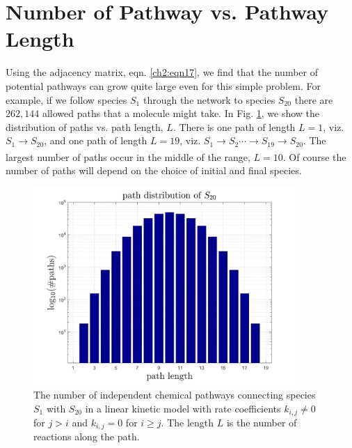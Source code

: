 \section{Number of Pathway vs. Pathway Length}
\label{ch2dot5:sec:path_len}
Using the adjacency matrix, eqn. \ref{ch2:eqn17}, we find that the number of potential
pathways can grow quite large even for this simple problem. For example, if we follow
species $S_1$ through the network to species $S_{20}$ there are $262,144$ allowed paths that a
molecule might take. In Fig. \ref{ch2dot5:fig3}, we show the distribution of paths vs. path length, $L$.
There is one path of length $L = 1$, viz. $S_1 \xrightarrow[]{} S_{20}$, and one path of length $L = 19$, viz.
$S_1 \xrightarrow[]{} S_2 \cdots → S_{19} \xrightarrow[]{} S_{20}$. The largest number of paths occur in the middle of the
range, $L = 10$. Of course the number of paths will depend on the choice of initial and
final species.
\begin{figure}[htbp]
	\caption[Number of path and path length distribution of linear model]{The number of independent chemical pathways connecting species $S_1$ with $S_{20}$ in a
linear kinetic model with rate coefficients $k_{i,j} \neq 0$ for $j > i$ and $k_{i,j} = 0$ for $i \geq j$. The length $L$ is
the number of reactions along the path.}
    \begin{center}
	\includegraphics[width=100mm]{figs/chapter2dot5/fig3.png}
    \end{center}
\label{ch2dot5:fig3}
\end{figure}

